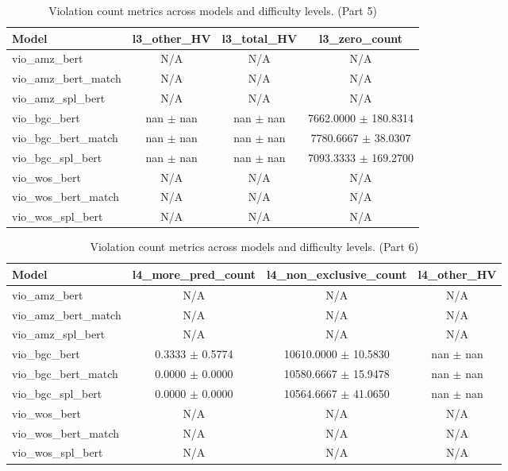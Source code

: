 \begin{table}[htbp]
\centering
\small
\begin{tabular}{lccc}
\toprule
Model & l3_other\_HV & l3_total\_HV & l3_zero\_count \\
\midrule
vio\_amz\_bert & N/A & N/A & N/A \\
vio\_amz\_bert\_match & N/A & N/A & N/A \\
vio\_amz\_spl\_bert & N/A & N/A & N/A \\
vio\_bgc\_bert & nan $\pm$ nan & nan $\pm$ nan & 7662.0000 $\pm$ 180.8314 \\
vio\_bgc\_bert\_match & nan $\pm$ nan & nan $\pm$ nan & 7780.6667 $\pm$ 38.0307 \\
vio\_bgc\_spl\_bert & nan $\pm$ nan & nan $\pm$ nan & 7093.3333 $\pm$ 169.2700 \\
vio\_wos\_bert & N/A & N/A & N/A \\
vio\_wos\_bert\_match & N/A & N/A & N/A \\
vio\_wos\_spl\_bert & N/A & N/A & N/A \\
\bottomrule
\end{tabular}
\caption{Violation count metrics across models and difficulty levels. (Part 5)}
\label{tab:vio_metrics_part5}
\end{table}

\begin{table}[htbp]
\centering
\small
\begin{tabular}{lccc}
\toprule
Model & l4_more\_pred\_count & l4_non\_exclusive\_count & l4_other\_HV \\
\midrule
vio\_amz\_bert & N/A & N/A & N/A \\
vio\_amz\_bert\_match & N/A & N/A & N/A \\
vio\_amz\_spl\_bert & N/A & N/A & N/A \\
vio\_bgc\_bert & 0.3333 $\pm$ 0.5774 & 10610.0000 $\pm$ 10.5830 & nan $\pm$ nan \\
vio\_bgc\_bert\_match & 0.0000 $\pm$ 0.0000 & 10580.6667 $\pm$ 15.9478 & nan $\pm$ nan \\
vio\_bgc\_spl\_bert & 0.0000 $\pm$ 0.0000 & 10564.6667 $\pm$ 41.0650 & nan $\pm$ nan \\
vio\_wos\_bert & N/A & N/A & N/A \\
vio\_wos\_bert\_match & N/A & N/A & N/A \\
vio\_wos\_spl\_bert & N/A & N/A & N/A \\
\bottomrule
\end{tabular}
\caption{Violation count metrics across models and difficulty levels. (Part 6)}
\label{tab:vio_metrics_part6}
\end{table}

